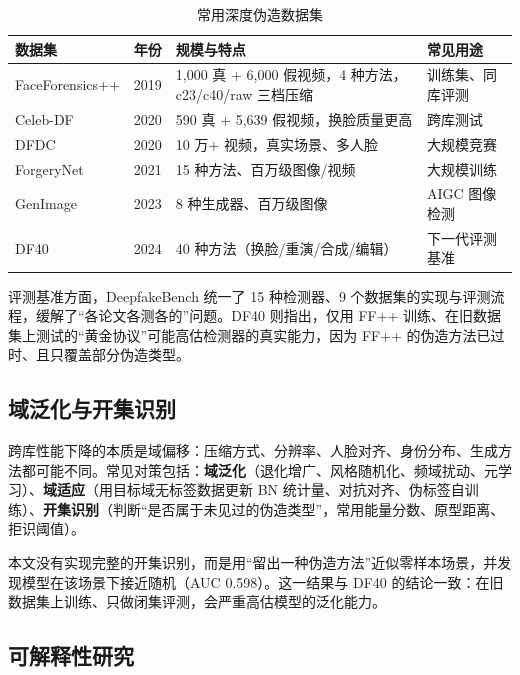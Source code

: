 \begin{table}[H]
\centering
\caption{常用深度伪造数据集}
\label{tab:datasets}
\small
\begin{tabular}{p{2.6cm}p{1.2cm}p{5.6cm}p{4.4cm}}
\toprule
数据集 & 年份 & 规模与特点 & 常见用途 \\
\midrule
FaceForensics++\cite{rossler2019ffpp} & 2019 & 1,000 真 + 6,000 假视频，4 种方法，c23/c40/raw 三档压缩 & 训练集、同库评测 \\
Celeb-DF\cite{li2020celebd} & 2020 & 590 真 + 5,639 假视频，换脸质量更高 & 跨库测试 \\
DFDC\cite{dolhansky2020dfdc} & 2020 & 10 万+ 视频，真实场景、多人脸 & 大规模竞赛 \\
ForgeryNet\cite{he2021forgerynet} & 2021 & 15 种方法、百万级图像/视频 & 大规模训练 \\
GenImage\cite{zhu2023genimage} & 2023 & 8 种生成器、百万级图像 & AIGC 图像检测 \\
DF40\cite{yan2024df40} & 2024 & 40 种方法（换脸/重演/合成/编辑） & 下一代评测基准 \\
\bottomrule
\end{tabular}
\end{table}

评测基准方面，DeepfakeBench\cite{yan2023deepfakebench} 统一了 15 种检测器、9 个数据集的实现与评测流程，缓解了“各论文各测各的”问题。DF40 则指出，仅用 FF++ 训练、在旧数据集上测试的“黄金协议”可能高估检测器的真实能力，因为 FF++ 的伪造方法已过时、且只覆盖部分伪造类型。

\subsection{域泛化与开集识别}

跨库性能下降的本质是域偏移：压缩方式、分辨率、人脸对齐、身份分布、生成方法都可能不同。常见对策包括：\textbf{域泛化}（退化增广、风格随机化、频域扰动、元学习）、\textbf{域适应}（用目标域无标签数据更新 BN 统计量、对抗对齐、伪标签自训练）、\textbf{开集识别}（判断“是否属于未见过的伪造类型”，常用能量分数、原型距离、拒识阈值）。

本文没有实现完整的开集识别，而是用“留出一种伪造方法”近似零样本场景，并发现模型在该场景下接近随机（AUC 0.598）。这一结果与 DF40 的结论一致：在旧数据集上训练、只做闭集评测，会严重高估模型的泛化能力。

\subsection{可解释性研究}

